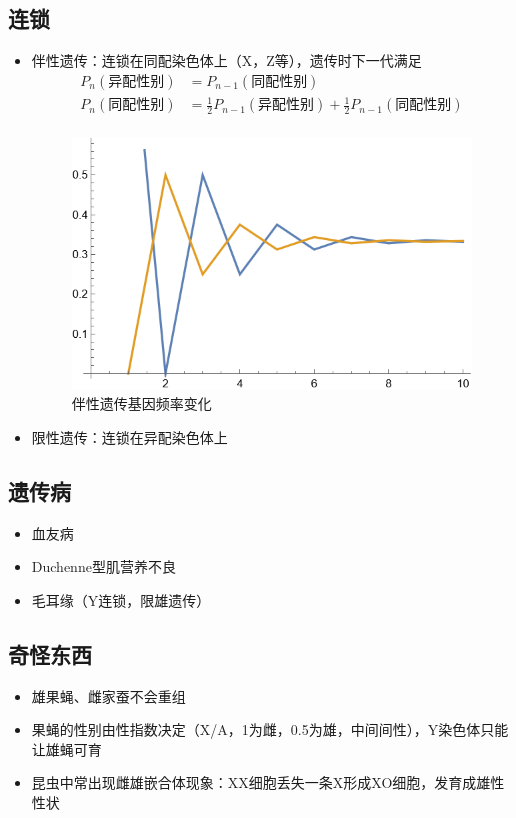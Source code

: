 \documentclass[a4paper, 12pt]{report}
\begin{document}
\subsection{连锁}
\begin{itemize}
    \item 伴性遗传：连锁在同配染色体上（X，Z等），遗传时下一代满足
          \[
              \begin{aligned}
                  P_n(\text{异配性别}) & =P_{n-1}(\text{同配性别})                                            \\
                  P_n(\text{同配性别}) & =\frac{1}{2}P_{n-1}(\text{异配性别})+\frac{1}{2}P_{n-1}(\text{同配性别}) \\
              \end{aligned}
          \]
          \begin{figure}[htbp]
              \centering
              \includegraphics{image.png}
              \caption{伴性遗传基因频率变化}
              \label{伴性遗传}
          \end{figure}
    \item 限性遗传：连锁在异配染色体上
\end{itemize}
\subsection{遗传病}
\begin{itemize}
    \item 血友病
    \item Duchenne型肌营养不良
    \item 毛耳缘（Y连锁，限雄遗传）
\end{itemize}
\subsection{奇怪东西}
\begin{itemize}
    \item 雄果蝇、雌家蚕不会重组
    \item 果蝇的性别由性指数决定（X/A，1为雌，0.5为雄，中间间性），Y染色体只能让雄蝇可育
    \item 昆虫中常出现雌雄嵌合体现象：XX细胞丢失一条X形成XO细胞，发育成雄性性状
\end{itemize}
\end{document}
